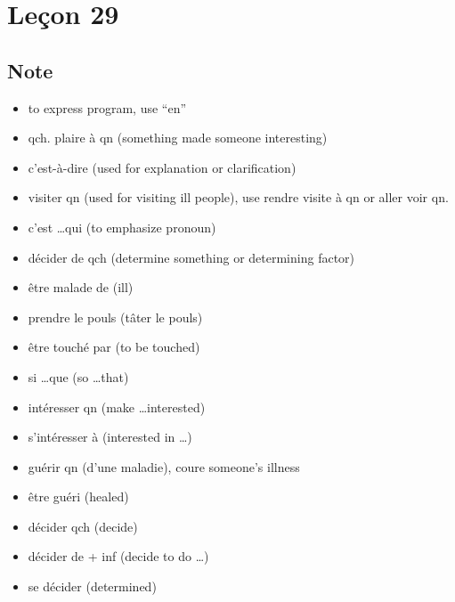 \documentclass{book}
\begin{document}
\chapter{Leçon 29}
    \section{Note}
        \begin{itemize}
            \item to express program, use ``en''
            \item qch. plaire à qn (something made someone interesting)
            \item c'est-à-dire (used for explanation or clarification)
            \item visiter qn (used for visiting ill people), use rendre visite à qn or aller voir qn.
            \item c'est \dots qui (to emphasize pronoun)
            \item décider de qch (determine something or determining factor)
            \item être malade de (ill)
            \item prendre le pouls (tâter le pouls)
            \item être touché par (to be touched)
            \item si \dots que (so \dots that)
            \item intéresser qn (make \dots interested)
            \item s'intéresser à (interested in \dots)
            \item guérir qn (d'une maladie), coure someone's illness
            \item être guéri (healed)
            \item décider qch (decide)
            \item décider de + inf (decide to do \dots)
            \item se décider (determined)
        \end{itemize}
\end{document}
